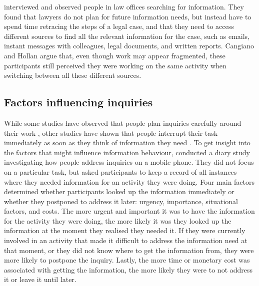 \citet{Cangiano2009} interviewed and observed people in law offices searching for information. They found that lawyers do not plan for future information needs, but instead have to spend time retracing the steps of a legal case, and that they need to access different sources to find all the relevant information for the case, such as emails, instant messages with colleagues, legal documents, and written reports. Cangiano and Hollan argue that, even though work may appear fragmented, these participants still perceived they were working on the same activity when switching between all these different sources.

\subsection{Factors influencing inquiries}
While some studies have observed that people plan inquiries carefully around their work \citep{Reddy2002}, other studies have shown that people interrupt their task immediately as soon as they think of information they need \citep{Jin2009}.
To get insight into the factors that might influence information behaviour, \citet{Sohn2008} conducted a diary study investigating how people address inquiries on a mobile phone. They did not focus on a particular task, but asked participants to keep a record of all instances where they needed information for an activity they were doing.  Four main factors determined whether participants looked up the information immediately or whether they postponed to address it later: urgency, importance, situational factors, and costs. The more urgent and important it was to have the information for the activity they were doing, the more likely it was they looked up the information at the moment they realised they needed it. If they were currently involved in an activity that made it difficult to address the information need at that moment, or they did not know where to get the information from, they were more likely to postpone the inquiry. Lastly, the more time or monetary cost was associated with getting the information, the more likely they were to not address it or leave it until later. 


